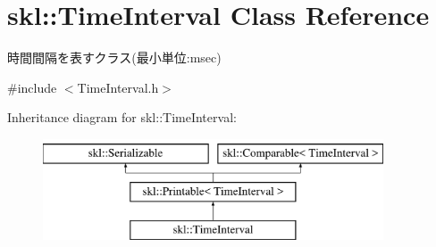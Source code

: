 \hypertarget{classskl_1_1_time_interval}{}\section{skl\+:\+:Time\+Interval Class Reference}
\label{classskl_1_1_time_interval}


時間間隔を表すクラス(最小単位\+:msec)  




{\ttfamily \#include $<$Time\+Interval.\+h$>$}

Inheritance diagram for skl\+:\+:Time\+Interval\+:\begin{figure}[H]
\begin{center}
\leavevmode
\includegraphics[height=3.000000cm]{classskl_1_1_time_interval}
\end{center}
\end{figure}
